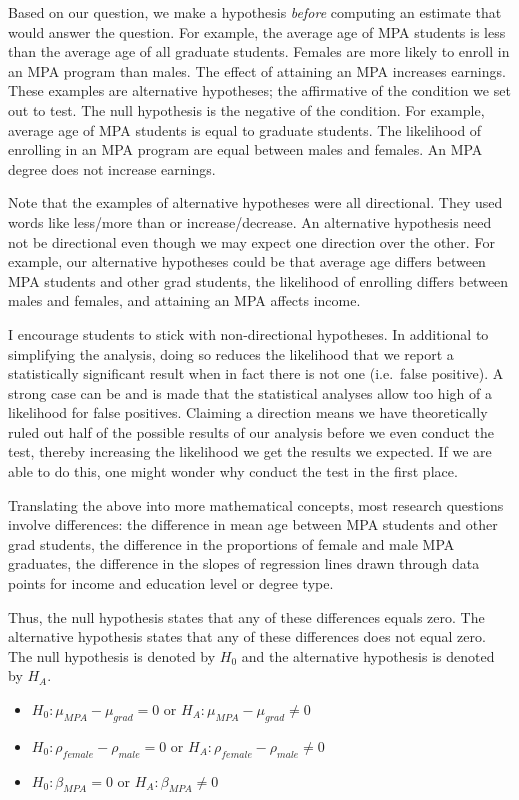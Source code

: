 \documentclass[
]{book}
\providecommand{\tightlist}{%
  \setlength{\itemsep}{0pt}\setlength{\parskip}{0pt}}
\begin{document}
Based on our question, we make a hypothesis \emph{before} computing an estimate that would answer the question. For example, the average age of MPA students is less than the average age of all graduate students. Females are more likely to enroll in an MPA program than males. The effect of attaining an MPA increases earnings. These examples are alternative hypotheses; the affirmative of the condition we set out to test. The null hypothesis is the negative of the condition. For example, average age of MPA students is equal to graduate students. The likelihood of enrolling in an MPA program are equal between males and females. An MPA degree does not increase earnings.

Note that the examples of alternative hypotheses were all directional. They used words like less/more than or increase/decrease. An alternative hypothesis need not be directional even though we may expect one direction over the other. For example, our alternative hypotheses could be that average age differs between MPA students and other grad students, the likelihood of enrolling differs between males and females, and attaining an MPA affects income.

I encourage students to stick with non-directional hypotheses. In additional to simplifying the analysis, doing so reduces the likelihood that we report a statistically significant result when in fact there is not one (i.e.~false positive). A strong case can be and is made that the statistical analyses allow too high of a likelihood for false positives. Claiming a direction means we have theoretically ruled out half of the possible results of our analysis before we even conduct the test, thereby increasing the likelihood we get the results we expected. If we are able to do this, one might wonder why conduct the test in the first place.

Translating the above into more mathematical concepts, most research questions involve differences: the difference in mean age between MPA students and other grad students, the difference in the proportions of female and male MPA graduates, the difference in the slopes of regression lines drawn through data points for income and education level or degree type.

Thus, the null hypothesis states that any of these differences equals zero. The alternative hypothesis states that any of these differences does not equal zero. The null hypothesis is denoted by \(H_0\) and the alternative hypothesis is denoted by \(H_A\).

\begin{itemize}
\tightlist
\item
  \(H_0: \mu_{MPA}-\mu_{grad} = 0\) or \(H_A: \mu_{MPA}-\mu_{grad} \neq 0\)
\item
  \(H_0: \rho_{female}-\rho_{male} = 0\) or \(H_A: \rho_{female}-\rho_{male} \neq 0\)
\item
  \(H_0: \beta_{MPA} = 0\) or \(H_A: \beta_{MPA} \neq 0\)
\end{itemize}
\end{document}
